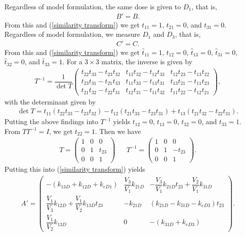 Regardless of model formulation, the same dose is given to $D_1$, that is,
\begin{align}
B' = B.
\end{align}
From this and (\ref{similarity transform}) we get $t_{11} = 1$, $t_{21} = 0$, and $t_{31} = 0$. Regardless of model formulation, we measure $D_1$ and $D_3$, that is,
\begin{align}
C' = C.
\end{align}
From this and (\ref{similarity transform}) we get $\hat{t}_{11} = 1$, $\hat{t}_{12} = 0$, $\hat{t}_{13} = 0$, $\hat{t}_{31} = 0$, $\hat{t}_{32} = 0$, and $\hat{t}_{33} = 1$. For a $3 \times 3$ matrix, the inverse is given by
\begin{align}
T^{-1} = \dfrac{1}{\det{T}}\begin{pmatrix}
t_{22}t_{33} - t_{23}t_{32} & t_{13}t_{32} - t_{12}t_{33} & t_{12}t_{23} - t_{13}t_{22} \\
t_{23}t_{31} - t_{21}t_{33} & t_{11}t_{33} - t_{13}t_{31} & t_{13}t_{21} - t_{11}t_{23} \\
t_{21}t_{32} - t_{22}t_{31} & t_{12}t_{31} - t_{11}t_{32} & t_{11}t_{22} - t_{12}t_{21} 
\end{pmatrix},
\end{align}
with the determinant given by 
\begin{align}
\det{T} = t_{11}(t_{22}t_{33} - t_{23}t_{32}) - t_{12}(t_{21}t_{33} - t_{23}t_{31}) + t_{13}(t_{21}t_{32} - t_{22}t_{31}).
\end{align}
Putting the above findings into $T^{-1}$ yields $t_{12} = 0$, $t_{13} = 0$, $t_{32} = 0$, and $t_{33} = 1$. From $TT^{-1} = I$, we get $t_{22} = 1$. Then we have
\begin{align}
T = \begin{pmatrix}
1 & 0 & 0 \\
0 & 1 & t_{23} \\
0 & 0 &  1
\end{pmatrix} &&
T^{-1} = \begin{pmatrix}
1 & 0 & 0 \\
0 & 1 & -t_{23} \\
0 & 0 &  1
\end{pmatrix}.
\end{align}
Putting this into (\ref{similarity transform}) yields
\begin{align}
A' = \begin{pmatrix}
-(k_{13D} + k_{12D} + k_{eD1})                           & \dfrac{V_3}{V_1}k_{21D} & -\dfrac{V_3}{V_1}k_{21D}t_{23} + \dfrac{V_2}{V_1}k_{31D} \\
\dfrac{V_1}{V_3}k_{12D} + \dfrac{V_1}{V_2}k_{13D}t_{23}  & -k_{21D}                & (k_{21D} - k_{31D} - k_{eD3})t_{23}                      \\
\dfrac{V_1}{V_2}k_{13D}                                  & 0                       & -(k_{31D} + k_{eD3})
\end{pmatrix}.
\end{align}
